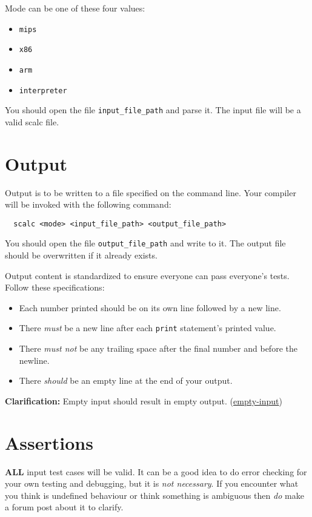 \documentclass{article}
\newcommand{\code}[1]{\texttt{\textmd{#1}}}
\newcommand{\clarification}[2]{\textbf{Clarification: }#1 (\hyperlink{#2}{#2})}
\begin{document}
Mode can be one of these four values:
\begin{itemize}
  \item \code{mips}
  \item \code{x86}
  \item \code{arm}
  \item \code{interpreter}
\end{itemize}

You should open the file \code{input\_file\_path} and parse it. The input file will be a valid
scalc file.

\section{Output}
Output is to be written to a file specified on the command line. Your compiler
will be invoked with the following command:
\begin{lstlisting}
  scalc <mode> <input_file_path> <output_file_path>
\end{lstlisting}
You should open the file \code{output\_file\_path} and write to it. The output file should be
overwritten if it already exists.

Output content is standardized to ensure everyone can pass everyone's tests. Follow these
specifications:
\begin{itemize}
  \item
    Each number printed should be on its own line followed by a new line.
  \item
    There \textit{must} be a new line after each \code{print} statement's printed value.
  \item
    There \textit{must not} be any trailing space after the final number and before the newline.
  \item
    There \textit{should} be an empty line at the end of your output.
\end{itemize}

\clarification{Empty input should result in empty output.}{empty-input}

\section{Assertions}
\textbf{ALL} input test cases will be valid. It can be a good idea to do error checking for your
own testing and debugging, but it is \textit{not necessary}. If you encounter what you think is
undefined behaviour or think something is ambiguous then \textit{do} make a forum post about it to
clarify.
\end{document}
